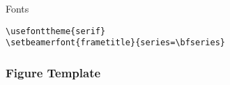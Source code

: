 \documentclass{beamer}
\begin{document}
\begin{frame}[fragile=singleslide]{Fonts}
    \begin{verbatim}
\usefonttheme{serif}
\setbeamerfont{frametitle}{series=\bfseries}
    \end{verbatim}





\end{frame}

\begin{frame}
    \frametitle{Figure Template}





\end{frame}
\end{document}
